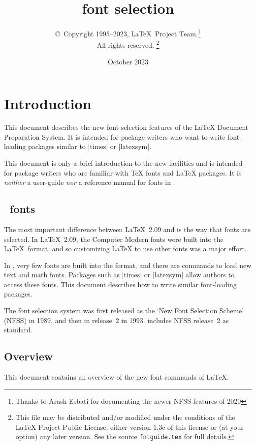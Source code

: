 \documentclass{ltxguide}[1995/11/28]
\title{\LaTeXe{} font selection}
\author{\copyright~Copyright 1995--2023, \LaTeX\ Project
  Team.\thanks{Thanks to Arash Esbati for documenting the
    newer NFSS features of 2020}\\
  All rights reserved.%
  \footnote{This file may be distributed and/or modified under the
    conditions of the \LaTeX{} Project Public License, either version 1.3c
    of this license or (at your option) any later version. See the source
   \texttt{fntguide.tex} for full details.}%
}
\date{October 2023}
\begin{document}
\maketitle

\tableofcontents

\section{Introduction}

This document describes the new font selection features of the \LaTeX{}
Document Preparation System.  It is intended for package writers who
want to write font-loading packages similar to |times| or |latexsym|.

This document is only a brief introduction to the new facilities and is
intended for package writers who are familiar with \TeX{} fonts and
\LaTeX{} packages.  It is \emph{neither} a user-guide \emph{nor} a
reference manual for fonts in \LaTeXe.

\subsection{\LaTeXe~fonts}

The most important difference between \LaTeX~2.09 and \LaTeXe{} is the
way that fonts are selected.  In \LaTeX~2.09, the Computer Modern fonts
were built into the \LaTeX~format, and so customizing \LaTeX{} to use
other fonts was a major effort.

In \LaTeXe, very few fonts are built into the format, and there are
commands to load new text and math fonts.  Packages such as |times| or
|latexsym| allow authors to access these fonts.  This document describes
how to write similar font-loading packages.

The \LaTeXe{} font selection system was first released as the `New Font
Selection Scheme' (NFSS) in 1989, and then in release~2 in 1993.
\LaTeXe{} includes NFSS release~2 as standard.

\subsection{Overview}

This document contains an overview of the new font commands of \LaTeX.
\end{document}
